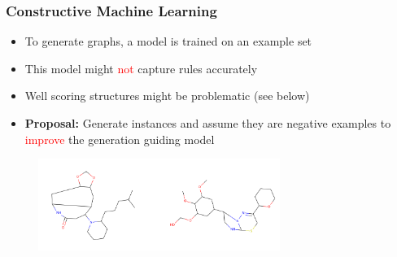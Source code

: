 \documentclass{beamer}
\newcommand{\red}[1]{\textcolor{red}{#1}}
\begin{document}
\begin{frame}
\frametitle{Constructive Machine Learning}
    \begin{itemize}

        \item To generate graphs, a model is trained on an example set
        \item This model might \red{not} capture rules accurately
        \item Well scoring structures might be problematic (see below)
        \item {\bf Proposal:} Generate instances and assume they are negative examples
            to \red{improve} the generation guiding model
    \end{itemize}
    \begin{figure}[ht]
        \centering
        \includegraphics[width=0.7\textwidth]{images/mole_shit.png}
    \end{figure}    
\end{frame}
\end{document}
